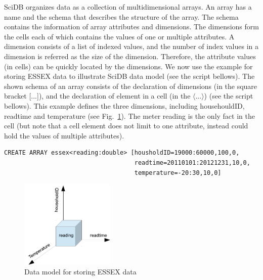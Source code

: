 \documentclass[a4paper,12pt]{llncs}
\begin{document}
SciDB organizes data as a collection of multidimensional arrays. An array has a name and the schema that describes the structure of the array. The schema contains the information of array attributes and dimensions. The dimensions form the cells each of which contains the values of one or multiple attributes. A dimension consists of a list of indexed values, and the number of index values in a dimension is referred as the size of the dimension. Therefore, the attribute values (in cells) can be quickly located by the dimensions. We now use the example for storing ESSEX data to illustrate SciDB data model (see the script bellows). The shown schema of an array consists of the declaration of dimensions (in the square bracket [...]), and the declaration of element in a cell (in the $\langle$...$\rangle$) (see the script bellows). This example defines the three dimensions, including househouldID, readtime and temperature (see Fig.~\ref{fig:essexdatamodel}). The meter reading is the only fact in the cell (but note that a cell element does not limit to one attribute, instead could hold the values of multiple attributes).
\newpage

\begin{verbatim}
CREATE ARRAY essex<reading:double> [housholdID=19000:60000,100,0,
                                    readtime=20110101:20121231,10,0,                       
                                    temperature=-20:30,10,0]
\end{verbatim}


\begin{figure}[htp]
\centering
\includegraphics[width=0.4\textwidth]{images/scidbdatamodel}
\caption{Data model for storing ESSEX data}
\label{fig:essexdatamodel}
\end{figure}

\end{document}

